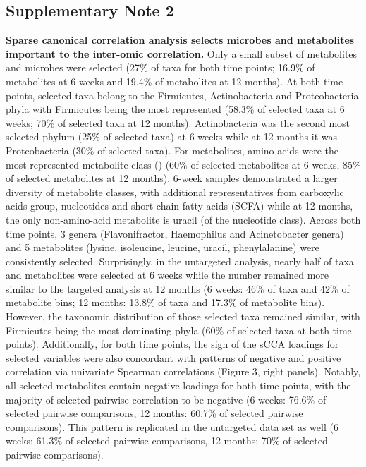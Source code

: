 \subsection{Supplementary Note 2} \label{appB_note2}
{\bf Sparse canonical correlation analysis selects microbes and metabolites important to the inter-omic correlation.} Only a small subset of metabolites and microbes were selected (27\% of taxa for both time points; 16.9\% of metabolites at 6 weeks and 19.4\% of metabolites at 12 months). At both time points, selected taxa belong to the Firmicutes, Actinobacteria and Proteobacteria phyla with Firmicutes being the most represented (58.3\% of selected taxa at 6 weeks; 70\% of selected taxa at 12 months). Actinobacteria was the second most selected phylum (25\% of selected taxa) at 6 weeks while at 12 months it was Proteobacteria (30\% of selected taxa). For metabolites, amino acids were the most represented metabolite class () (60\% of selected metabolites at 6 weeks, 85\% of selected metabolites at 12 months). 6-week samples demonstrated a larger diversity of metabolite classes, with additional representatives from carboxylic acids group, nucleotides and short chain fatty acids (SCFA) while at 12 months, the only non-amino-acid metabolite is uracil (of the nucleotide class). Across both time points, 3 genera (Flavonifractor, Haemophilus and Acinetobacter genera) and 5 metabolites (lysine, isoleucine, leucine, uracil, phenylalanine) were consistently selected. Surprisingly, in the untargeted analysis, nearly half of taxa and metabolites were selected at 6 weeks while the number remained more similar to the targeted analysis at 12 months (6 weeks: 46\% of taxa and 42\% of metabolite bins; 12 months: 13.8\% of taxa and  17.3\% of metabolite bins). However, the taxonomic distribution of those selected taxa remained similar, with Firmicutes being the most dominating phyla (60\% of selected taxa at both time points). Additionally, for both time points, the sign of the sCCA loadings for selected variables were also concordant with patterns of negative and positive correlation via univariate Spearman correlations (Figure 3, right panels). Notably, all selected metabolites contain negative loadings for both time points, with the majority of selected pairwise correlation to be negative (6 weeks: 76.6\% of selected pairwise comparisons, 12 months: 60.7\% of selected pairwise comparisons). This pattern is replicated in the untargeted data set as well (6 weeks: 61.3\% of selected pairwise comparisons, 12 months: 70\% of selected pairwise comparisons). 

